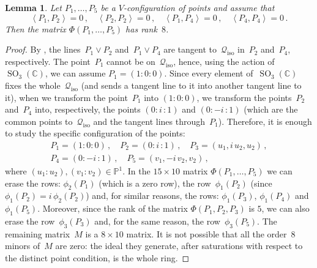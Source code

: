 \documentclass[a4paper, 11pt, reqno]{amsart}
\theoremstyle{plain}
\newtheorem{lemma}{Lemma}[section]
\theoremstyle{definition}
\newcommand{\C}{\mathbb{C}}
\newcommand{\p}{\mathbb{P}}
\newcommand{\iii}{\textit{i}\,}
\newcommand{\iso}{\mathcal{Q}_{\mathrm{iso}}}
\newcommand{\SO}{\operatorname{SO}}
\newcommand{\scl}[2]{\left\langle {#1}, {#2} \right\rangle}
\begin{document}
\begin{lemma}
\label{lemma:special_case_rank_8}
Let $P_1, \dots, P_5$ be a $V$-configuration of points and assume that
%
\[
  \scl{P_1}{P_2}=0 \,, \quad
  \scl{P_2}{P_2}=0 \,, \quad
  \scl{P_1}{P_4}=0 \,, \quad
  \scl{P_4}{P_4}=0 \,.
\]
%
Then the matrix $\Phi(P_1, \dots, P_5)$ has rank~$8$.
\end{lemma}
\begin{proof}
By ,
the lines~$P_1 \vee P_2$ and~$P_1 \vee P_4$ are tangent to~$\iso$ in~$P_2$ and~$P_4$, respectively. 
The point~$P_1$ cannot be on~$\iso$, hence, using the
action of~$\SO_3(\C)$, we can assume $P_1 = (1: 0: 0)$.
Since every element of~$\SO_3(\C)$ fixes the whole~$\iso$ (and sends a tangent line to it into another tangent line to it), 
when we transform the point~$P_1$ into $(1: 0: 0)$, 
we transform the points~$P_2$ and~$P_4$ into, respectively,
the points $(0: \iii: 1)$ and $(0: -\iii: 1)$ (which are the common points to~$\iso$ and the tangent lines through~$P_1$).
Therefore, it is enough to study the
specific configuration of the points:
%
\begin{gather*}
  P_1 = (1: 0: 0) \,, \quad P_2=(0: \iii: 1) \,, \quad P_3=(u_1, \iii u_2, u_2) \,, \\
  P_4 = (0: -\iii: 1) \,, \quad P_5 = (v_1, -\iii v_2, v_2) \,,
\end{gather*}
%
where $(u_1: u_2), (v_1: v_2) \in \p^1$.
In the $15\times 10$ matrix $\Phi(P_1, \dots, P_5)$ we can erase the
rows: $\phi_2(P_1)$ (which is a zero row), the row~$\phi_1(P_2)$
(since $\phi_1(P_2)=\iii\phi_2(P_2)$) and, for similar reasons, the
rows: $\phi_1(P_3)$, $\phi_1(P_4)$ and~$\phi_1(P_5)$.
Moreover, since the rank of the matrix $\Phi(P_1, P_2, P_3)$ is $5$,
we can also erase the row~$\phi_3(P_3)$ and, for the same reason, the
row~$\phi_3(P_5)$. The remaining matrix~$M$ is a $8 \times 10$ matrix.
It is not possible that all the order~$8$ minors
of~$M$ are zero: the ideal they generate, after saturations with respect to the distinct point condition, is the whole ring.
\end{proof}
\end{document}
